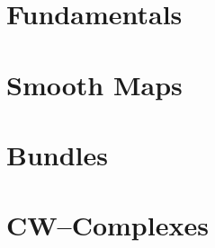 

\section{Fundamentals}


\section{Smooth Maps}


\section{Bundles}


\section{CW--Complexes}



%
